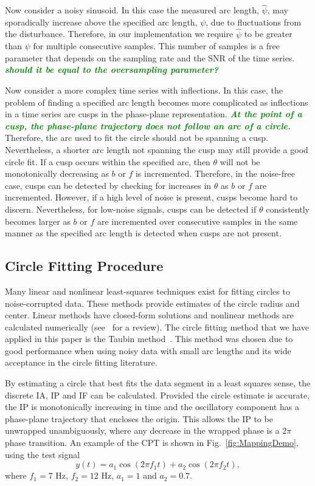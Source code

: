 \documentclass[a4paper]{IEEEtran}
\newcommand{\dean}[1]{\textsf{\emph{\textbf{\textcolor{green}{#1}}}}}
\begin{document}
Now consider a noisy sinusoid. In this case the measured arc length, $\hat\psi$, may sporadically increase above the specified arc length, $\psi$, due to fluctuations from the disturbance. Therefore, in our implementation we require $\hat\psi$ to be greater than $\psi$ for multiple consecutive samples. This number of samples is a free parameter that depends on the sampling rate and the SNR of the time series. \dean{should it be equal to the oversampling parameter?}

Now consider a more complex time series with inflections. In this case, the problem of finding a specified arc length becomes more complicated as inflections in a time series are cusps in the phase-plane representation. \dean{At the point of a cusp, the phase-plane trajectory does not follow an arc of a circle.} Therefore, the arc used to fit the circle should not be spanning a cusp. Nevertheless, a shorter arc length not spanning the cusp may still provide a good circle fit. 
If a cusp occurs within the specified arc, then $\theta$ will not be monotonically decreasing as $b$ or $f$ is incremented. Therefore, in the noise-free case, cusps can be detected by checking for increases in $\theta$ as $b$ or $f$ are incremented. However, if a high level of noise is present, cusps become hard to discern. Nevertheless, for low-noise signals, cusps can be detected if $\theta$ consistently becomes larger as $b$ or $f$ are incremented over consecutive samples in the same manner as the specified arc length is detected when cusps are not present. 

\subsection{Circle Fitting Procedure}\label{sect:CircleFittingProcedure}
Many linear and nonlinear least-squares techniques exist for fitting circles to noise-corrupted data. These methods provide estimates of the circle radius and center. Linear methods have closed-form solutions and nonlinear methods are calculated numerically (see~\cite{Chernov2005} for a review). The circle fitting method that we have applied in this paper is the Taubin method~\cite{Taubin1991}. This method was chosen due to good performance when using noisy data with small arc lengths and its wide acceptance in the circle fitting literature.

By estimating a circle that best fits the data segment in a least squares sense, the discrete IA, IP and IF can be calculated. Provided the circle estimate is accurate, the IP is monotonically increasing in time and the oscillatory component has a phase-plane trajectory that encloses the origin. This allows the IP to be unwrapped unambiguously, where any decrease in the wrapped phase is a $2\pi$ phase transition. An example of the CPT is shown in Fig.~\ref{fig:MappingDemo}, using the test signal
\begin{equation}\label{eq:SecondTestSig}
y\left( t \right) = a_1\cos \left(2\pi f_1 t\right) + a_2\cos \left(2\pi f_2 t\right),
\end{equation}
where $f_1 = 7$ Hz, $f_2 = 12$ Hz, $a_1 = 1$ and $a_2=0.7$.
\end{document}
